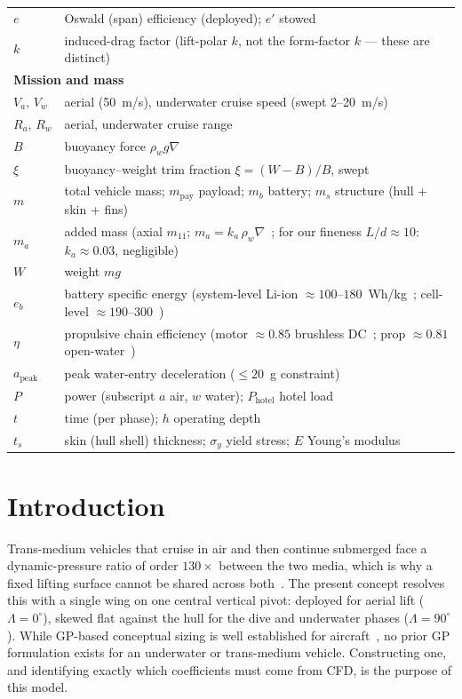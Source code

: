 \documentclass{new-aiaa}
\begin{document}
\begin{longtable}{@{}l p{10cm}@{}}
$e$      & Oswald (span) efficiency (deployed); $e'$ stowed \\
$k$      & induced-drag factor (lift-polar $k$, not the form-factor $k$ --- these are distinct) \\
\multicolumn{2}{l}{\textbf{Mission and mass}}\\
$V_a,\,V_w$ & aerial (50~m/s), underwater cruise speed (swept 2--20~m/s) \\
$R_a,\,R_w$ & aerial, underwater cruise range \\
$B$      & buoyancy force $\rho_w g\nabla$ \\
$\xi$    & buoyancy--weight trim fraction $\xi=(W-B)/B$, swept \\
$m$      & total vehicle mass; $m_{\text{pay}}$ payload; $m_b$ battery; $m_s$ structure (hull + skin + fins) \\
$m_{a}$ & added mass (axial $m_{11}$; $m_{a}=k_a\,\rho_w\nabla$~\cite{newman2018marine}; for our fineness $L/d\approx10$: $k_a\approx0.03$, negligible) \\
$W$      & weight $mg$ \\
$e_b$    & battery specific energy (system-level Li-ion $\approx 100$--$180$~Wh/kg~\cite{rutherford2008southampton}; cell-level $\approx 190$--$300$~\cite{lin2026energies}) \\
$\eta$   & propulsive chain efficiency (motor $\approx0.85$ brushless DC~\cite{allen2000propulsion}; prop $\approx0.81$ open-water~\cite{allen2000propulsion}) \\
$a_{\text{peak}}$ & peak water-entry deceleration ($\le20$~g constraint)\\
$P$      & power (subscript $a$ air, $w$ water); $P_{\text{hotel}}$ hotel load \\
$t$      & time (per phase); $h$ operating depth \\
$t_s$    & skin (hull shell) thickness; $\sigma_y$ yield stress; $E$ Young's modulus \\
\end{longtable}

\section{Introduction}
Trans-medium vehicles that cruise in air and then continue submerged face a dynamic-pressure ratio of
order $130\times$ between the two media, which is why a fixed lifting surface cannot be shared across
both~\cite{long2025entire}. The present concept resolves this with a single wing on one central vertical pivot: deployed for
aerial lift ($\Lambda=0^\circ$), skewed flat against the hull for the dive and underwater phases
($\Lambda=90^\circ$). While GP-based conceptual sizing is well established for
aircraft~\cite{hoburg2014geometric,boyd2007tutorial,kirschen2018application}, no prior GP formulation
exists for an underwater or trans-medium vehicle. Constructing one, and identifying exactly which
coefficients must come from CFD, is the purpose of this model.
\end{document}
